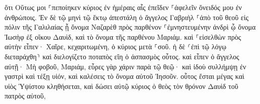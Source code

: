 \documentclass{openreader}
\begin{document}
ὅτι Οὕτως μοι ⸀πεποίηκεν κύριος ἐν ἡμέραις αἷς ἐπεῖδεν ⸀ἀφελεῖν ὄνειδός μου ἐν ἀνθρώποις. 
Ἐν δὲ τῷ μηνὶ τῷ ἕκτῳ ἀπεστάλη ὁ ἄγγελος Γαβριὴλ ⸀ἀπὸ τοῦ θεοῦ εἰς πόλιν τῆς Γαλιλαίας ᾗ ὄνομα Ναζαρὲθ 
πρὸς παρθένον ⸀ἐμνηστευμένην ἀνδρὶ ᾧ ὄνομα Ἰωσὴφ ἐξ οἴκου Δαυὶδ, καὶ τὸ ὄνομα τῆς παρθένου Μαριάμ. 
καὶ ⸀εἰσελθὼν πρὸς αὐτὴν εἶπεν· Χαῖρε, κεχαριτωμένη, ὁ κύριος μετὰ ⸀σοῦ. 
ἡ δὲ ⸂ἐπὶ τῷ λόγῳ διεταράχθη⸃ καὶ διελογίζετο ποταπὸς εἴη ὁ ἀσπασμὸς οὗτος. 
καὶ εἶπεν ὁ ἄγγελος αὐτῇ· Μὴ φοβοῦ, Μαριάμ, εὗρες γὰρ χάριν παρὰ τῷ θεῷ· 
καὶ ἰδοὺ συλλήμψῃ ἐν γαστρὶ καὶ τέξῃ υἱόν, καὶ καλέσεις τὸ ὄνομα αὐτοῦ Ἰησοῦν. 
οὗτος ἔσται μέγας καὶ υἱὸς Ὑψίστου κληθήσεται, καὶ δώσει αὐτῷ κύριος ὁ θεὸς τὸν θρόνον Δαυὶδ τοῦ πατρὸς αὐτοῦ, 
\end{document}
